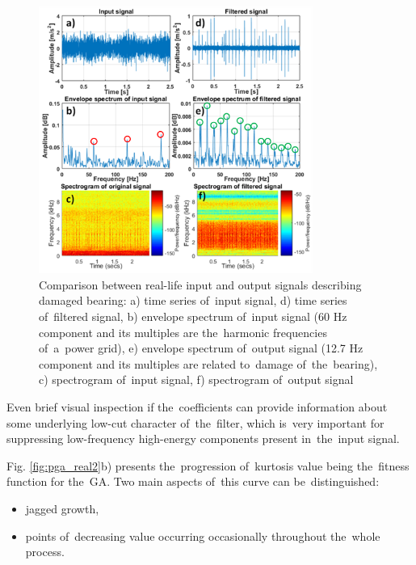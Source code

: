 \begin{figure}[ht!]
\centering
\includegraphics[width=0.8\textwidth]{wykresy/pga_real1.png}
\caption{Comparison between real-life input and output signals describing damaged bearing: a) time series of~input signal, d) time series of~filtered signal, b) envelope spectrum of~input signal (60 Hz component and its multiples are the~harmonic frequencies of~a~power grid), e) envelope spectrum of~output signal (12.7 Hz component and its multiples are related to~damage of~the~bearing), c) spectrogram of~input signal, f) spectrogram of~output signal}
\label{fig:pga_real1}
\end{figure}

Even brief visual inspection if the~coefficients can provide information about some underlying low-cut character of~the~filter, which is~very important for suppressing low-frequency high-energy components present in~the~input signal.

Fig. \ref{fig:pga_real2}b) presents the~progression of~kurtosis value being the~fitness function for the~GA. Two main aspects of~this curve can be~distinguished:

\begin{itemize}
  \item jagged growth,
  \item points of~decreasing value occurring occasionally throughout the~whole process.
\end{itemize}

